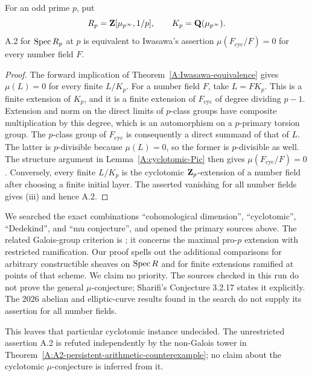 \begin{corollary}
\label{A:canonical-Iwasawa}
For an odd prime $p$, put
\[
 R_p=\mathbf Z[\mu_{p^\infty},1/p],\qquad K_p=\mathbf Q(\mu_{p^\infty}).
\]
A.2 for $\operatorname{Spec} R_p$ at $p$ is equivalent to Iwasawa's assertion
$\mu(F_{\mathrm{cyc}}/F)=0$ for every number field $F$.
\end{corollary}
\begin{proof}
The forward implication of Theorem~\ref{A:Iwasawa-equivalence} gives
$\mu(L)=0$ for every finite $L/K_p$. For a number field $F$, take
$L=FK_p$. This is a finite extension of $K_p$, and it is a finite
extension of $F_{\mathrm{cyc}}$ of degree dividing $p-1$.
Extension and norm on the direct limits of $p$-class groups have
composite multiplication by this degree, which is an automorphism
on a $p$-primary torsion group. The $p$-class group of
$F_{\mathrm{cyc}}$ is consequently a direct summand of that of $L$.
The latter is $p$-divisible because $\mu(L)=0$, so the former is
$p$-divisible as well. The structure argument in
Lemma~\ref{A:cyclotomic-Pic} then gives $\mu(F_{\mathrm{cyc}}/F)=0$.
Conversely, every finite $L/K_p$ is the cyclotomic $\mathbf Z_p$-extension
of a number field after choosing a finite initial layer. The asserted
vanishing for all number fields gives (iii) and hence A.2.
\end{proof}

\begin{remark}
We searched the exact combinations ``cohomological dimension'',
``cyclotomic'', ``Dedekind'', and ``mu conjecture'', and opened
the primary sources above. The related Galois-group criterion is
\citet[Theorem 11.3.7]{A_NSW}; it concerns the maximal pro-$p$
extension with restricted ramification. Our proof spells out the
additional comparisons for arbitrary constructible sheaves on
$\operatorname{Spec} R$ and for finite extensions ramified at points of that
scheme. We claim no priority. The sources checked in this run do
not prove the general $\mu$-conjecture; Sharifi's Conjecture 3.2.17
states it explicitly. The 2026 abelian and elliptic-curve results
found in the search do not supply its assertion for all number fields.

This leaves that particular cyclotomic instance undecided. The
unrestricted assertion A.2 is refuted independently by the non-Galois
tower in Theorem~\ref{A:A2-persistent-arithmetic-counterexample}; no
claim about the cyclotomic $\mu$-conjecture is inferred from it.
\end{remark}

